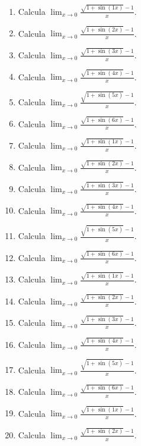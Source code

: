 \documentclass[11pt,a4paper]{article}
\begin{document}
\begin{enumerate}[label=\textbf{E\arabic*.},start=561]

\item Calcula $\displaystyle\lim_{x\to0}\frac{\sqrt{1+\sin(1x)}-1}{x}$.

\item Calcula $\displaystyle\lim_{x\to0}\frac{\sqrt{1+\sin(2x)}-1}{x}$.

\item Calcula $\displaystyle\lim_{x\to0}\frac{\sqrt{1+\sin(3x)}-1}{x}$.

\item Calcula $\displaystyle\lim_{x\to0}\frac{\sqrt{1+\sin(4x)}-1}{x}$.

\item Calcula $\displaystyle\lim_{x\to0}\frac{\sqrt{1+\sin(5x)}-1}{x}$.

\item Calcula $\displaystyle\lim_{x\to0}\frac{\sqrt{1+\sin(6x)}-1}{x}$.

\item Calcula $\displaystyle\lim_{x\to0}\frac{\sqrt{1+\sin(1x)}-1}{x}$.

\item Calcula $\displaystyle\lim_{x\to0}\frac{\sqrt{1+\sin(2x)}-1}{x}$.

\item Calcula $\displaystyle\lim_{x\to0}\frac{\sqrt{1+\sin(3x)}-1}{x}$.

\item Calcula $\displaystyle\lim_{x\to0}\frac{\sqrt{1+\sin(4x)}-1}{x}$.

\item Calcula $\displaystyle\lim_{x\to0}\frac{\sqrt{1+\sin(5x)}-1}{x}$.

\item Calcula $\displaystyle\lim_{x\to0}\frac{\sqrt{1+\sin(6x)}-1}{x}$.

\item Calcula $\displaystyle\lim_{x\to0}\frac{\sqrt{1+\sin(1x)}-1}{x}$.

\item Calcula $\displaystyle\lim_{x\to0}\frac{\sqrt{1+\sin(2x)}-1}{x}$.

\item Calcula $\displaystyle\lim_{x\to0}\frac{\sqrt{1+\sin(3x)}-1}{x}$.

\item Calcula $\displaystyle\lim_{x\to0}\frac{\sqrt{1+\sin(4x)}-1}{x}$.

\item Calcula $\displaystyle\lim_{x\to0}\frac{\sqrt{1+\sin(5x)}-1}{x}$.

\item Calcula $\displaystyle\lim_{x\to0}\frac{\sqrt{1+\sin(6x)}-1}{x}$.

\item Calcula $\displaystyle\lim_{x\to0}\frac{\sqrt{1+\sin(1x)}-1}{x}$.

\item Calcula $\displaystyle\lim_{x\to0}\frac{\sqrt{1+\sin(2x)}-1}{x}$.

\end{enumerate}
\end{document}
